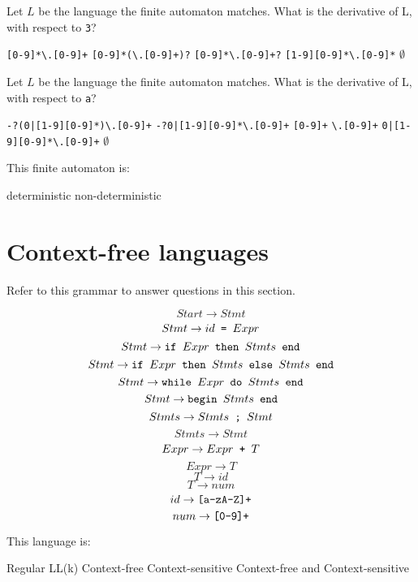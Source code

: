 \documentclass[addpoints]{exam}
\begin{document}
\begin{questions}
\answerline

\question Let $L$ be the language the finite automaton matches. What is the derivative of L, with respect to \verb$3$?

\begin{choices}
\choice \verb$[0-9]*\.[0-9]+$
\choice \verb$[0-9]*(\.[0-9]+)?$
\choice \verb$[0-9]*\.[0-9]+?$
\choice \verb$[1-9][0-9]*\.[0-9]*$
\choice $\emptyset$
\end{choices}

\answerline

\question Let $L$ be the language the finite automaton matches. What is the derivative of L, with respect to \verb$a$?

\begin{choices}
\choice \verb$-?(0|[1-9][0-9]*)\.[0-9]+$
\choice \verb$-?0|[1-9][0-9]*\.[0-9]+$
\choice \verb$[0-9]+$
\choice \verb$\.[0-9]+$
\choice \verb$0|[1-9][0-9]*\.[0-9]+$
\choice $\emptyset$
\end{choices}

\answerline

\question This finite automaton is:
\begin{oneparchoices}
\choice deterministic
\choice non-deterministic
\end{oneparchoices}
\answerline
\pagebreak

\section{Context-free languages}
Refer to this grammar to answer questions in this section.

$$Start \to Stmt$$
$$Stmt \to id \verb+ = + Expr$$
$$Stmt \to \verb+if + Expr \verb+ then + Stmts \verb+ end+$$
$$Stmt \to \verb+if + Expr \verb+ then + Stmts \verb+ else + Stmts \verb+ end+$$
$$Stmt \to \verb+while + Expr \verb+ do + Stmts \verb+ end+$$
$$Stmt \to \verb+begin + Stmts \verb+ end+$$
$$Stmts \to Stmts \verb+ ; + Stmt$$
$$Stmts \to Stmt$$
$$Expr \to Expr \verb| + | T$$
$$Expr \to T$$
$$T \to id$$
$$T \to num$$
$$id \to \verb|[a-zA-Z]+|$$
$$num \to \verb|[0-9]+|$$

\question This language is:

\begin{oneparchoices}
\choice Regular
\choice LL(k)
\choice Context-free
\choice Context-sensitive
\choice Context-free and Context-sensitive
\end{oneparchoices}

\answerline


\end{questions}
\end{document}
